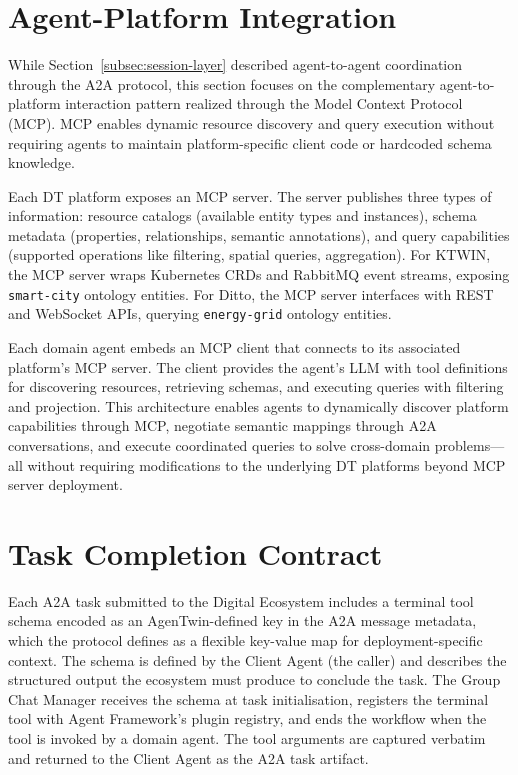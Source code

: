 \section{Agent-Platform Integration}
\label{sec:agent-interaction-impl}

While Section~\ref{subsec:session-layer} described
    agent-to-agent coordination through the A2A protocol,
    this section focuses on the complementary agent-to-platform interaction pattern
    realized through the Model Context Protocol (MCP).
MCP enables dynamic resource discovery and query execution without requiring agents to
    maintain platform-specific client code or
    hardcoded schema knowledge.

Each DT platform exposes an MCP server.
The server publishes three types of information:
    resource catalogs (available entity types and instances),
    schema metadata (properties, relationships, semantic annotations), and
    query capabilities (supported operations like filtering, spatial queries, aggregation).
For KTWIN, the MCP server wraps Kubernetes CRDs and RabbitMQ event streams,
    exposing \texttt{smart-city} ontology entities.
For Ditto, the MCP server interfaces with REST and WebSocket APIs,
    querying \texttt{energy-grid} ontology entities.

Each domain agent embeds an MCP client
    that connects to its associated platform's MCP server.
The client provides the agent's LLM with tool definitions for
    discovering resources,
    retrieving schemas, and
    executing queries with filtering and projection.
This architecture enables agents to dynamically discover platform capabilities through MCP,
    negotiate semantic mappings through A2A conversations, and
    execute coordinated queries to solve cross-domain problems---all
    without requiring modifications to the underlying DT platforms beyond MCP server deployment.

\section{Task Completion Contract}
\label{sec:task-completion-contract}
Each A2A task submitted to the Digital Ecosystem includes a terminal tool schema
    encoded as an AgenTwin-defined key in the A2A message metadata,
    which the protocol defines as a flexible key-value map for deployment-specific context.
The schema is defined by the Client Agent (the caller) and describes the structured
    output the ecosystem must produce to conclude the task.
The Group Chat Manager receives the schema at task initialisation,
    registers the terminal tool with Agent Framework's plugin registry, %
    and ends the workflow when the tool is invoked by a domain agent.
The tool arguments are captured verbatim and returned to the Client Agent
    as the A2A task artifact.

